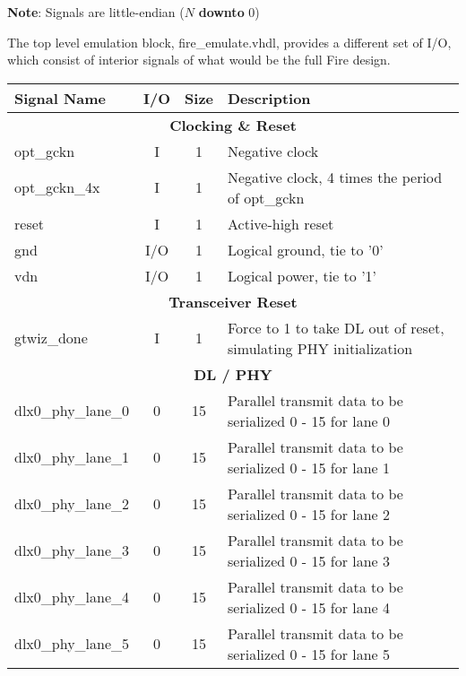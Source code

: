 \textbf{Note}: Signals are little-endian ($N$ \textbf{downto} 0)

\begin{emulation}
  The top level emulation block, fire\_emulate.vhdl, provides a
  different set of I/O, which consist of interior signals of what
  would be the full Fire design.

  \begin{center}
    \begin{longtable}{ l | c | c | p{.55\linewidth} }
      Signal Name                     & I/O & Size & Description \\ \hline
      \endhead
      \multicolumn{4}{c}{\textbf{Clocking \& Reset}} \\ \hline
      opt\_gckn                       & I   & 1    & Negative clock \\ \hline
      opt\_gckn\_4x                   & I   & 1    & Negative clock, 4 times the period of opt\_gckn \\ \hline
      reset                           & I   & 1    & Active-high reset \\ \hline
      gnd                             & I/O & 1    & Logical ground, tie to '0' \\ \hline
      vdn                             & I/O & 1    & Logical power, tie to '1' \\ \hline
      \multicolumn{4}{c}{\textbf{Transceiver Reset}} \\ \hline
      gtwiz\_done                     & I   & 1    & Force to 1 to take DL out of reset, simulating PHY initialization \\ \hline
      \multicolumn{4}{c}{\textbf{DL / PHY}} \\ \hline
      dlx0\_phy\_lane\_0              & 0   & 15  & Parallel transmit data to be serialized 0 - 15 for lane 0 \\ \hline
      dlx0\_phy\_lane\_1              & 0   & 15  & Parallel transmit data to be serialized 0 - 15 for lane 1 \\ \hline
      dlx0\_phy\_lane\_2              & 0   & 15  & Parallel transmit data to be serialized 0 - 15 for lane 2 \\ \hline
      dlx0\_phy\_lane\_3              & 0   & 15  & Parallel transmit data to be serialized 0 - 15 for lane 3 \\ \hline
      dlx0\_phy\_lane\_4              & 0   & 15  & Parallel transmit data to be serialized 0 - 15 for lane 4 \\ \hline
      dlx0\_phy\_lane\_5              & 0   & 15  & Parallel transmit data to be serialized 0 - 15 for lane 5 \\ \hline

\end{longtable}
\end{center}
\end{emulation}
